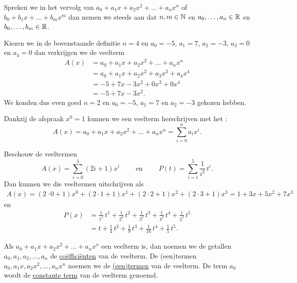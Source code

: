 \documentclass{ximera}
\begin{document}
Spreken we in het vervolg van  $a_0 + a_1x + a_2x^2 + \dots + a_n x^n$ of $b_0 + b_1x + \dots + b_m x^m$ dan nemen we steeds aan dat $n,m\in \mathbb{N}$ en $a_0, \ldots, a_n\in \mathbb{R}$ en $b_0, \ldots, b_m\in \mathbb{R}$.

\begin{example}
Kiezen we in de bovenstaande definitie $n = 4$ en $a_0 = -5$, $a_1 = 7$, $a_2 = -3$, $a_3 = 0$ en $a_4 = 0$ dan verkrijgen we de veelterm
\begin{align*}
A(x) 
& = a_0 + a_1x + a_2x^2 + \dots + a_n x^n \\
& = a_0 + a_1x + a_2x^2 + a_3 x^3 + a_4 x^4 \\ 
& = -5 + 7x - 3x^2 + 0x^3 + 0x^4 \\
& = -5 + 7x - 3x^2.
\end{align*}
We konden dus even goed $n = 2$ en $a_0 = -5$, $a_1 = 7$ en $a_2 = -3$ gekozen hebben. 
\end{example}

Dankzij de afspraak $x^0 = 1$ kunnen we een veelterm herschrijven met het :
\[
A(x) = a_0 + a_1x + a_2x^2 + \dots + a_n x^n = \sum_{i=0}^n a_i x^i.
\]

\begin{example}
Beschouw de veeltermen
\[
A(x) = \sum_{i=0}^3 (2i+1) x^i \qquad \text{ en } \qquad P(t) = \sum_{i=1}^5 \frac{1}{i^2} \, t^i.
\] 
Dan kunnen we die veeltermen uitschrijven als
\begin{align*}
A(x)  = (2\cdot0+1)x^0 + (2\cdot1+1)x^1 + (2\cdot2+1)x^2 + (2\cdot3+1)x^3 = 1 + 3x + 5x^2 + 7x^3
\end{align*}
en
\begin{align*}
P(x) 
& = \frac{1}{1^2} \, t^1 + \frac{1}{2^2} \, t^2 + \frac{1}{3^2} \, t^3 + \frac{1}{4^2} \, t^4 + \frac{1}{5^2} \, t^5 \\
& = t + \frac{1}{4}\,t^2 + \frac{1}{9}\,t^3 + \frac{1}{16}\,t^4 + \frac{1}{5}\,t^5.
\end{align*}
\end{example}

Als $a_0 + a_1x + a_2x^2 + \dots + a_n x^n$ een veelterm is, dan noemen we de getallen $a_0, a_1, a_2, \ldots, a_n$ de \underline{co\"effici\"enten} van de veelterm. De (een)termen $a_0, a_1x, a_2x^2, \ldots , a_nx^n$ noemen we de \underline{(een)termen} van de veelterm. De term $a_0$ wordt de \underline{constante term} van de veelterm genoemd.
\end{document}
